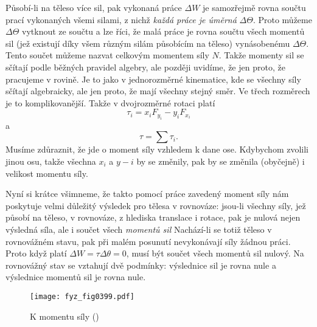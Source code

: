     Působí-li na těleso více sil, pak vykonaná práce \(\Delta W\) je samozřejmě rovna součtu prací
    vykonaných všemi silami, z nichž \emph{každá práce je úměrná} \(\Delta \varTheta\). Proto můžeme
    \(\Delta \varTheta\) vytknout ze součtu a lze říci, že malá práce je rovna součtu všech momentů
    sil (jež existují díky všem různým silám působícím na těleso) vynásobenému \(\Delta \varTheta\).
    Tento součet můžeme nazvat celkovým momentem síly \(N\). Takže momenty sil se sčítají podle
    běžných pravidel algebry, ale později uvidíme, že jen proto, že pracujeme v rovině. Je to jako v
    jednorozměrné kinematice, kde se všechny síly sčítají algebraicky, ale jen proto, že mají
    všechny stejný směr. Ve třech rozměrech je to komplikovanější. Takže v dvojrozměrné rotaci platí
    \begin{equation}\label{fyz:eq660}
      τ_i=x_iF_{y_i}−y_iF_{x_i}
    \end{equation}
    a 
    \begin{equation}\label{fyz:eq661}
      τ=∑τ_i.
    \end{equation}
    Musíme zdůraznit, že jde o moment síly vzhledem k dane ose. Kdybychom zvolili jinou osu, takže
    všechna \(x_i\) a \(y-i\) by se změnily, pak by se změnila (obyčejně) i velikost momentu síly.

    Nyní si krátce všimneme, že takto pomocí práce zavedený moment síly nám poskytuje velmi
    důležitý výsledek pro tělesa v rovnováze: jsou-li všechny síly, jež působí na těleso, v
    rovnováze, z hlediska translace i rotace, pak je nulová nejen výsledná síla, ale i součet všech
    \emph{momentů sil} Nachází-li se totiž těleso v rovnovážném stavu, pak při malém posunutí
    nevykonávají síly žádnou práci. Proto když platí \(ΔW=τΔθ=0\), musí být součet všech momentů sil
    nulový. Na rovnovážný stav se vztahují dvě podmínky: výslednice sil je rovna nule a výslednice
    momentů sil je rovna nule. 

    \begin{figure}[ht!] %
      \centering
      \texttt{[image: fyz\_fig0399.pdf]}
      \caption{K momentu síly (\cite[s.~253]{Feynman01})}
      \label{fyz:fig0399}
    \end{figure}

